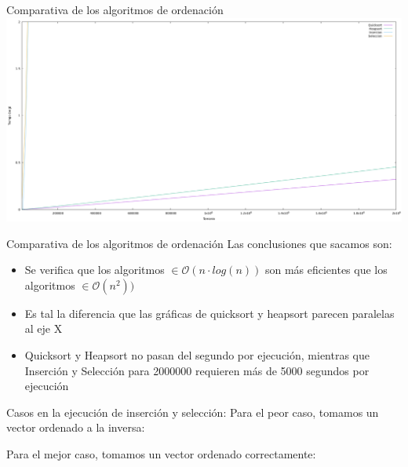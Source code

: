 \documentclass[10pt, xcolor=table]{beamer}
\begin{document}
\begin{frame}[fragile]{Comparativa de los algoritmos de ordenación}
	\centering
	\includegraphics[scale=0.15]{../../Images/Gráfica comparativa algoritmos ordenación Joshoccas (H y Q).png}
\end{frame}

\begin{frame}[fragile]{Comparativa de los algoritmos de ordenación}
Las conclusiones que sacamos son:
\begin{itemize}
	\item Se verifica que los algoritmos \(\in \mathcal{O}(n \cdot log(n))\) son más eficientes que los algoritmos \(\in \mathcal{O}(n^2))\)
	\item Es tal la diferencia que las gráficas de quicksort y heapsort parecen paralelas al eje X
	\item Quicksort y Heapsort no pasan del segundo por ejecución, mientras que Inserción y Selección para 2000000 requieren más de 5000 segundos por ejecución
\end{itemize}
\end{frame}

\begin{frame}{Casos en la ejecución de inserción y selección: 
}
	Para el peor caso, tomamos un vector ordenado a la inversa:
	
	Para el mejor caso, tomamos un vector ordenado correctamente:
	
	
\end{frame}
\end{document}
